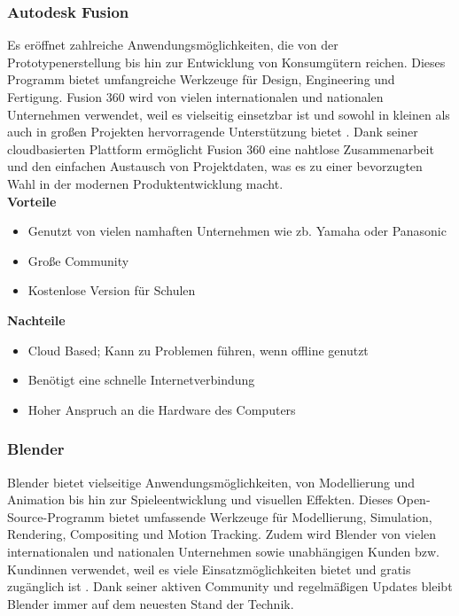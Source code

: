 \subsubsection{Autodesk Fusion}
Es eröffnet zahlreiche Anwendungsmöglichkeiten, die von der Prototypenerstellung bis hin zur Entwicklung von Konsumgütern reichen. Dieses Programm bietet umfangreiche Werkzeuge für Design, Engineering und Fertigung.  Fusion 360 wird von vielen internationalen und nationalen Unternehmen verwendet, weil es vielseitig einsetzbar ist und sowohl in kleinen als auch in großen Projekten hervorragende Unterstützung bietet \textcite{AutodeskFusion}. Dank seiner cloudbasierten Plattform ermöglicht Fusion 360 eine nahtlose Zusammenarbeit und den einfachen Austausch von Projektdaten, was es zu einer bevorzugten Wahl in der modernen Produktentwicklung macht. \\


\textbf{Vorteile}
\begin{itemize}
	\item Genutzt von vielen namhaften Unternehmen wie zb. Yamaha oder Panasonic
	\item Große Community
	\item Kostenlose Version für Schulen \textcite{AutodeskFusionReviews}
\end{itemize} 

\textbf{Nachteile}
\begin{itemize}
	\item Cloud Based; Kann zu Problemen führen, wenn offline genutzt 
	\item Benötigt eine schnelle Internetverbindung
	\item Hoher Anspruch an die Hardware des Computers \textcite{AutodeskFusionReviews}
\end{itemize}



\subsubsection{Blender} 
Blender bietet vielseitige Anwendungsmöglichkeiten, von Modellierung und Animation bis hin zur Spieleentwicklung und visuellen Effekten. Dieses Open-Source-Programm bietet umfassende Werkzeuge für Modellierung, Simulation, Rendering, Compositing und Motion Tracking. Zudem wird Blender von vielen internationalen und nationalen Unternehmen sowie unabhängigen Kunden bzw. Kundinnen verwendet, weil es viele Einsatzmöglichkeiten bietet und gratis zugänglich ist \textcite{Blender}. Dank seiner aktiven Community und regelmäßigen Updates bleibt Blender immer auf dem neuesten Stand der Technik. \\


